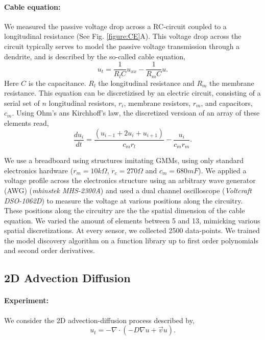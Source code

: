 \documentclass{article} %
\begin{document}
\paragraph{Cable equation:} We measured the passive voltage drop across a RC-circuit coupled to a longitudinal resistance (See Fig. \ref{figure:CE}A). This voltage drop across the circuit typically serves to model the passive voltage transmission through a dendrite, and is described by the so-called cable equation,
\begin{equation}
    u_t = \frac{1}{R_l C} u_{xx} - \frac{1}{R_m C} u.
\end{equation}
Here $C$ is the capacitance. $R_l$ the longitudinal resistance and $R_m$ the membrane resistance. This equation can be discretizised by an electric circuit, consisting of a serial set of $n$ longitudinal resistors, $r_i$, membrane resistors, $r_m$, and capacitors, $c_m$. Using Ohm’s ans Kirchhoff’s law, the discretized versioan of an array of these elements read, 
\begin{equation}
\frac{du_{i}}{dt}= \frac{(u_{i-1}+2 u_i + u_{i+1})}{c_{m}r_{l}} - \frac{u_i}{c_{m}r_{m}}.
\end{equation}

We use a breadboard using structures imitating GMMs, using only standard electronics hardware ($r_m = 10 k \Omega$, $r_c = 270 \Omega$ and $c_m = 680 mF$). We applied a voltage profile across the electronics structure using an arbitrary wave generator (AWG) (\textit{mhinstek MHS-2300A})  and used a dual channel oscilloscope (\textit{Voltcraft DSO-1062D}) to measure the voltage at various positions along the circuitry. These positions along the circuitry are the the spatial dimension of the cable equation. We varied the amount of elements between 5 and 13, mimicking various spatial discretizations. At every sensor, we collected 2500 data-points. We trained the model discovery algorithm on a function library up to first order polynomials and second order derivatives.

\subsection{2D Advection Diffusion}

\paragraph{Experiment:} We consider the 2D advection-diffusion process described by,
\begin{equation}
  u_t = -\nabla\cdot\left(-D\nabla u + \vec{v} u \right). 
\end{equation}
\end{document}
